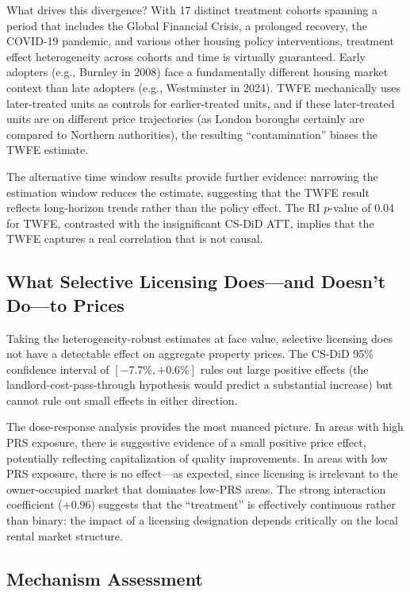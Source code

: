 \documentclass[12pt]{article}
\begin{document}
What drives this divergence? With 17 distinct treatment cohorts spanning a period that includes the Global Financial Crisis, a prolonged recovery, the COVID-19 pandemic, and various other housing policy interventions, treatment effect heterogeneity across cohorts and time is virtually guaranteed. Early adopters (e.g., Burnley in 2008) face a fundamentally different housing market context than late adopters (e.g., Westminster in 2024). TWFE mechanically uses later-treated units as controls for earlier-treated units, and if these later-treated units are on different price trajectories (as London boroughs certainly are compared to Northern authorities), the resulting ``contamination'' biases the TWFE estimate.

The alternative time window results provide further evidence: narrowing the estimation window reduces the estimate, suggesting that the TWFE result reflects long-horizon trends rather than the policy effect. The RI $p$-value of 0.04 for TWFE, contrasted with the insignificant CS-DiD ATT, implies that the TWFE captures a real correlation that is not causal.

\subsection{What Selective Licensing Does---and Doesn't Do---to Prices}

Taking the heterogeneity-robust estimates at face value, selective licensing does not have a detectable effect on aggregate property prices. The CS-DiD 95\% confidence interval of $[-7.7\%, +0.6\%]$ rules out large positive effects (the landlord-cost-pass-through hypothesis would predict a substantial increase) but cannot rule out small effects in either direction.

The dose-response analysis provides the most nuanced picture. In areas with high PRS exposure, there is suggestive evidence of a small positive price effect, potentially reflecting capitalization of quality improvements. In areas with low PRS exposure, there is no effect---as expected, since licensing is irrelevant to the owner-occupied market that dominates low-PRS areas. The strong interaction coefficient ($+0.96$) suggests that the ``treatment'' is effectively continuous rather than binary: the impact of a licensing designation depends critically on the local rental market structure.

\subsection{Mechanism Assessment}
\end{document}
